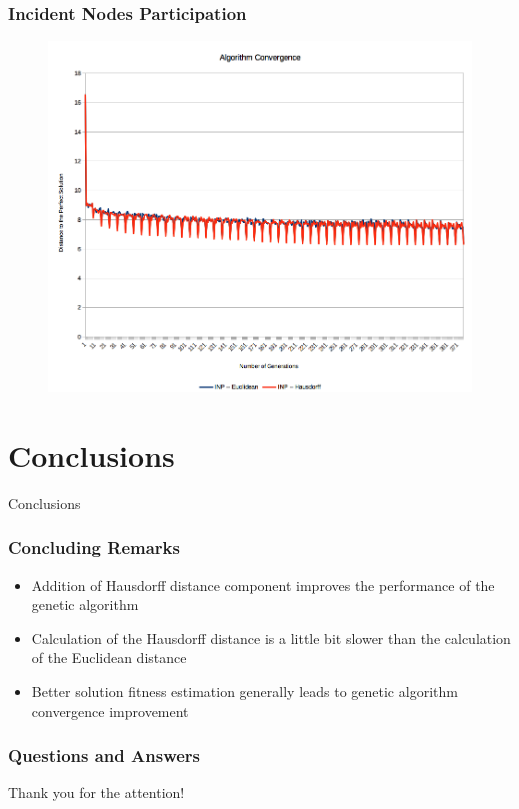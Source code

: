 \documentclass{beamer}
\begin{document}
\begin{frame}
\frametitle{Incident Nodes Participation}
\begin{figure}[h]
  \centering
  \includegraphics[width=1.0\textwidth,height=0.5\textwidth]{fig04}
  \label{fig04}
\end{figure}
\end{frame}

\section{Conclusions}

\begin{frame}
\center \huge{Conclusions}
\end{frame}

\begin{frame}
\frametitle{Concluding Remarks}
\begin{itemize}
  \item Addition of Hausdorff distance component improves the performance of the genetic algorithm
  \item Calculation of the Hausdorff distance is a little bit slower than the calculation of the Euclidean distance
  \item Better solution fitness estimation generally leads to genetic algorithm convergence improvement
\end{itemize}
\end{frame}

\begin{frame}
\frametitle{Questions and Answers}
\center \huge{Thank you for the attention!}
\end{frame}
\end{document}
